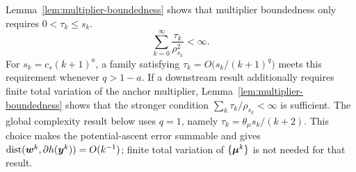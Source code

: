 \begin{remark}
\label{rmk:dual-stepsize-choice}
Lemma~\ref{lem:multiplier-boundedness} shows that multiplier boundedness only
requires $0<\tau_k\le s_k$.  
\[
    \sum_{k=0}^{\infty}\frac{\tau_k}{\rho_{s_k}^2}
    <\infty.
\]
For $s_k=c_s(k+1)^a$, a family satisfying
$\tau_k=O\bigl(s_k/(k+1)^q\bigr)$ meets this requirement whenever
$q>1-a$.  If a downstream result additionally requires finite total variation
of the anchor multiplier, Lemma~\ref{lem:multiplier-boundedness} shows that the
stronger condition $\sum_k\tau_k/\rho_{s_k}<\infty$ is sufficient.  The global
complexity result below uses $q=1$, namely
$\tau_k=\theta_\mu s_k/(k+2)$.  This choice makes the potential-ascent error
summable and gives
$\operatorname{dist}(\bm{w}^k,\partial h(\bm{y}^k))=O(k^{-1})$; finite total
variation of $\{\bm{\mu}^k\}$ is not needed for that result.
\end{remark}
